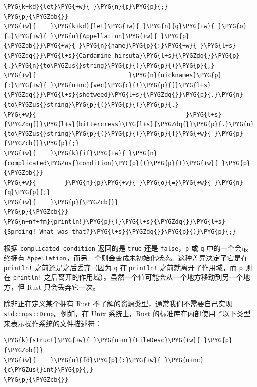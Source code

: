 \begin{Verbatim}[commandchars=\\\{\},breaklines=true,breakanywhere=true,fontsize=\codefont,xleftmargin=17bp]
\PYG{k+kd}{let}\PYG{+w}{ }\PYG{n}{p}\PYG{p}{;}
\PYG{p}{\PYGZob{}}
\PYG{+w}{    }\PYG{k+kd}{let}\PYG{+w}{ }\PYG{n}{q}\PYG{+w}{ }\PYG{o}{=}\PYG{+w}{ }\PYG{n}{Appellation}\PYG{+w}{ }\PYG{p}{\PYGZob{}}\PYG{+w}{ }\PYG{n}{name}\PYG{p}{:}\PYG{+w}{ }\PYG{l+s}{\PYGZdq{}}\PYG{l+s}{Cardamine hirsuta}\PYG{l+s}{\PYGZdq{}}\PYG{p}{.}\PYG{n}{to\PYGZus{}string}\PYG{p}{(}\PYG{p}{)}\PYG{p}{,}
\PYG{+w}{                          }\PYG{n}{nicknames}\PYG{p}{:}\PYG{+w}{ }\PYG{n+nc}{vec}\PYG{o}{!}\PYG{p}{[}\PYG{l+s}{\PYGZdq{}}\PYG{l+s}{shotweed}\PYG{l+s}{\PYGZdq{}}\PYG{p}{.}\PYG{n}{to\PYGZus{}string}\PYG{p}{(}\PYG{p}{)}\PYG{p}{,}
\PYG{+w}{                                          }\PYG{l+s}{\PYGZdq{}}\PYG{l+s}{bittercress}\PYG{l+s}{\PYGZdq{}}\PYG{p}{.}\PYG{n}{to\PYGZus{}string}\PYG{p}{(}\PYG{p}{)}\PYG{p}{]}\PYG{+w}{ }\PYG{p}{\PYGZcb{}}\PYG{p}{;}
\PYG{+w}{    }\PYG{k}{if}\PYG{+w}{ }\PYG{n}{complicated\PYGZus{}condition}\PYG{p}{(}\PYG{p}{)}\PYG{+w}{ }\PYG{p}{\PYGZob{}}
\PYG{+w}{        }\PYG{n}{p}\PYG{+w}{ }\PYG{o}{=}\PYG{+w}{ }\PYG{n}{q}\PYG{p}{;}
\PYG{+w}{    }\PYG{p}{\PYGZcb{}}
\PYG{p}{\PYGZcb{}}
\PYG{n+nf+fm}{println!}\PYG{p}{(}\PYG{l+s}{\PYGZdq{}}\PYG{l+s}{Sproing! What was that?}\PYG{l+s}{\PYGZdq{}}\PYG{p}{)}\PYG{p}{;}
\end{Verbatim}

根据 \texttt{complicated\_condition} 返回的是 \texttt{true} 还是 \texttt{false}，\texttt{p} 或 \texttt{q} 中的一个会最终拥有 \texttt{Appellation}，而另一个则会变成未初始化状态。这种差异决定了它是在 \texttt{println!} 之前还是之后丢弃（因为 \texttt{q} 在 \texttt{println!} 之前就离开了作用域，而 \texttt{p} 则在 \texttt{println!} 之后离开的作用域）。虽然一个值可能会从一个地方移动到另一个地方，但 Rust 只会丢弃它一次。

除非正在定义某个拥有 Rust 不了解的资源类型，通常我们不需要自己实现 \texttt{std::ops::Drop}。例如，在 Unix 系统上，Rust 的标准库在内部使用了以下类型来表示操作系统的文件描述符：

\begin{Verbatim}[commandchars=\\\{\},breaklines=true,breakanywhere=true,fontsize=\codefont,xleftmargin=17bp]
\PYG{k}{struct}\PYG{+w}{ }\PYG{n+nc}{FileDesc}\PYG{+w}{ }\PYG{p}{\PYGZob{}}
\PYG{+w}{    }\PYG{n}{fd}\PYG{p}{:}\PYG{+w}{ }\PYG{n+nc}{c\PYGZus{}int}\PYG{p}{,}
\PYG{p}{\PYGZcb{}}
\end{Verbatim}

